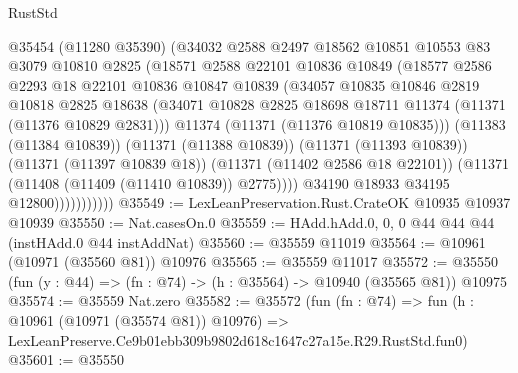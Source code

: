 \begin{lexlean}{RustStd}
\begin{coremodule}
                        @35454
                        (@11280 @35390)
                        (@34032
                          @2588
                          @2497
                          @18562
                          @10851
                          @10553
                          @83
                          @3079
                          @10810
                          @2825
                          (@18571
                            @2588
                            @22101
                            @10836
                            @10849
                            (@18577
                              @2586
                              @2293
                              @18
                              @22101
                              @10836
                              @10847
                              @10839
                              (@34057
                                @10835
                                @10846
                                @2819
                                @10818
                                @2825
                                @18638
                                (@34071
                                  @10828
                                  @2825
                                  @18698
                                  @18711
                                  @11374
                                  (@11371 (@11376 @10829 @2831)))
                                @11374
                                (@11371 (@11376 @10819 @10835)))
                              (@11383 (@11384 @10839))
                              (@11371 (@11388 @10839))
                              (@11371 (@11393 @10839))
                              (@11371 (@11397 @10839 @18))
                              (@11371 (@11402 @2586 @18 @22101))
                              (@11371 (@11408 (@11409 (@11410 @10839)) @2775))))
                          @34190
                          @18933
                          @34195
                          @12800)))))))))))
@35549 := LexLeanPreservation.Rust.CrateOK @10935 @10937 @10939
@35550 := Nat.casesOn.{0}
@35559 := HAdd.hAdd.{0, 0, 0} @44 @44 @44 (instHAdd.{0} @44 instAddNat)
@35560 := @35559 @11019
@35564 := @10961 (@10971 (@35560 @81)) @10976
@35565 := @35559 @11017
@35572 := @35550 (fun (y : @44) => (fn : @74) -> (h : @35564) -> @10940 (@35565 @81)) @10975
@35574 := @35559 Nat.zero
@35582 := @35572
    (fun (fn : @74) =>
    fun (h : @10961 (@10971 (@35574 @81)) @10976) =>
    LexLeanPreserve.Ce9b01ebb309b9802d618c1647c27a15e.R29.RustStd.fun0)
@35601 := @35550

\end{coremodule}
\end{lexlean}
